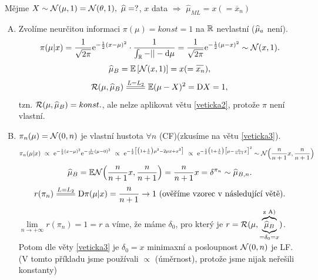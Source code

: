 \begin{example}
	Mějme $X\sim\mathcal{N}(\mu,1)=\mathcal{N}(\theta,1),~\widehat{\mu}=?$, $x$ data $\Rightarrow$ $\widehat{\mu}_{ML}=x(=\overline{x}_n)$
	\begin{enumerate}[A)]
		\item Zvolíme neurčitou informaci $\pi(\mu)=konst=1$ na $\mathbb{R}$ nevlastní ($\widehat{\mu}_a$ není). $$\pi(\mu|x)=\frac{1}{\sqrt{2\pi}}\mathrm{e}^{-\frac{1}{2}(x-\mu)^2}\cdot \frac{1}{\int_{\mathbb{R}} -||-\mathrm{d}\mu}=\frac{1}{\sqrt{2\pi}}\mathrm{e}^{-\frac{1}{2}(\mu-x)^2}\sim\mathcal{N}(x,1).$$
		$$\widehat{\mu}_B=\EE{\NN(x,1)}=x(=\oxnn),$$
		$$ \RF(\mu,\widehat{\mu}_B)\equal{L=L_2}\E(\mu-X)^2=\D X=1,$$ tzn. $\mathcal{R}(\mu,\widehat{\mu}_B)=konst.$, ale nelze aplikovat větu \ref{veticka2}, protože $\pi$ není vlastní.
		\item $\pi_n(\mu)=\mathcal{N}(0,n)$ je vlastní hustota $\forall n$ (CF)(zkusíme na větu \ref{veticka3}).
		\[
		\begin{split}
		\pi_n(\mu|x)~\propto~ \mathrm{e}^{-\frac{1}{2}(x-\mu)^2}\mathrm{e}^{-\frac{1}{2n}(\mu-0)^2}~\propto~\mathrm{e}^{-\frac{1}{2}\big[\big(1+\frac{1}{n}\big)\mu^2-2\mu x+x^2\big]}~\propto~\mathrm{e}^{-\frac{1}{2}\big(1+\frac{1}{n}\big)\big[\mu-\frac{n}{n+1}x\big]^2}\sim \mathcal{N}\Big(\frac{n}{n+1}x,\frac{n}{n+1}\Big)
		\end{split}
		\]
		$$\widehat{\mu}_B=\mathbb{E} \mathcal{N}\Big(\frac{n}{n+1}x,\frac{n}{n+1}\Big)=\frac{n}{n+1}x=\delta^{\pi_n}\sim\widehat{\mu}_{B,n}.$$
		$$r(\pi_n)\equal{L=L_2}\D \pi(\mu|x)=\frac{n}{n+1}\to1 \text{ (ověříme vzorec v následující větě)}.$$
		$\lim\limits_{n\to+\infty}r(\pi_n)=1=r$ a víme, že máme $\delta_0$, pro který je $r=\mathcal{R}(\mu,\underbrace{\overbrace{\widehat{\mu}_B}^{\text{z A)}}}_{=\delta_0=x})$. Potom dle věty \ref{veticka3} je $\delta_0=x$ minimaxní a posloupnost $\mathcal{N}(0,n)$ je LF. (V tomto příkladu jsme používali $\propto$ (úměrnost), protože jsme nijak neřešili konstanty)
	\end{enumerate}
\end{example}
